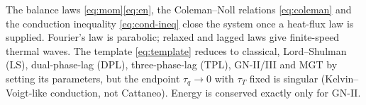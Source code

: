 \begin{summarybox}[Summary]
The balance laws \eqref{eq:mom}\textendash\eqref{eq:en}, the Coleman--Noll relations \eqref{eq:coleman} and the conduction inequality \eqref{eq:cond-ineq} close the system once a heat-flux law is supplied. Fourier's law is parabolic; relaxed and lagged laws give finite-speed thermal waves. The template \eqref{eq:template} reduces to classical, Lord--Shulman (LS), dual-phase-lag (DPL), three-phase-lag (TPL), GN-II/III and MGT by setting its parameters, but the endpoint $\tau_q\to0$ with $\tau_T$ fixed is singular (Kelvin--Voigt-like conduction, not Cattaneo). Energy is conserved exactly only for GN-II.
\end{summarybox}
